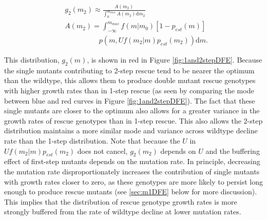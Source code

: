 \documentclass[9pt,twocolumn,twoside,lineno]{gsajnl}
\begin{document}
\begin{equation}\label{eq:g2m}
\begin{aligned}
&g_2(m_2) \approx \frac{A(m_2)}{\int_0^{m_{max}} A(m_2) \mathrm{d}m_2} \\
&A(m_2) = \int_{-\infty}^{m_{max}} f(m|m_0) \left[ 1 - p_{est}(m) \right] \\
&\hspace{2cm}p(m,U f(m_2|m) p_{est}(m_2))\mathrm{d}m.
\end{aligned}
\end{equation}

\noindent This distribution, $g_2(m)$, is shown in red in Figure \ref{fig:1and2stepDFE}.
Because the single mutants contributing to 2-step rescue tend to be nearer the optimum than the wildtype, this allows them to produce double mutant rescue genotypes with higher growth rates than in 1-step rescue (as seen by comparing the mode between blue and red curves in Figure \ref{fig:1and2stepDFE}).
The fact that these single mutants are closer to the optimum also allows for a greater variance in the growth rates of rescue genotypes than in 1-step rescue.
This also allows the 2-step distribution maintains a more similar mode and variance across wildtype decline rate than the 1-step distribution.
Note that because the $U$ in $U f(m_2|m) p_{est}(m_2)$ does not cancel, $g_2(m_2)$ depends on $U$ and the buffering effect of first-step mutants depends on the mutation rate. 
In principle, decreasing the mutation rate disproportionately increases the contribution of single mutants with growth rates closer to zero, as these genotypes are more likely to persist long enough to produce rescue mutants (see \ref{sec:m1DFE} below for more discussion).
This implies that the distribution of rescue genotype growth rates is more strongly buffered from the rate of wildtype decline at lower mutation rates.
\end{document}
